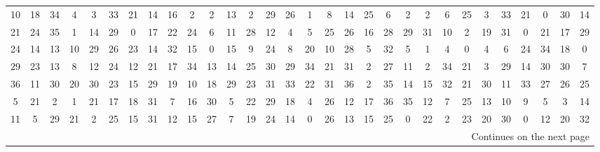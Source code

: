 \documentclass[11pt,twoside]{article}
\numberwithin{Theorem}{section}
\numberwithin{Definition}{section}
\numberwithin{Lemma}{section}
\numberwithin{Algorithm}{section}
\numberwithin{equation}{section}
\begin{document}
\begin{table}
\begin{tabular}{|*{30}{c|}}
10 &18 &34 &4 &3 &33 &21 &14 &16 &2 &2 &13 &2 &29 &26&1 &8 &14 &25 &6 &2 &2 &6 &25 &3 &33 &21 &0 &30 &14\\
21 &24 &35 &1 &14 &29 &0 &17 &22 &24 &6 &11 &28 &12 &4&5 &25 &26 &16 &28 &29 &31 &10 &2 &19 &31 &0 &21 &17 &29\\
24 &14 &13 &10 &29 &26 &23 &14 &32 &15 &0 &15 &9 &24 &8&20 &10 &28 &5 &32 &5 &1 &4 &0 &4 &6 &24 &34 &18 &0\\
29 &23 &13 &8 &12 &24 &12 &21 &17 &34 &13 &14 &25 &30 &29&34 &21 &31 &2 &27 &11 &2 &34 &21 &3 &29 &14 &30 &30 &7\\
36 &11 &30 &20 &30 &23 &15 &29 &19 &10 &18 &29 &23 &31 &33&22 &31 &36 &2 &35 &14 &15 &32 &21 &30 &11 &33 &27 &26 &25\\
5 &21 &2 &1 &21 &17 &18 &31 &7 &16 &30 &5 &22 &29 &18&4 &26 &12 &17 &36 &35 &12 &7 &25 &13 &10 &9 &5 &3 &14\\
11 &5 &29 &21 &2 &25 &15 &31 &12 &15 &27 &7 &19 &24 &14&0 &26 &13 &15 &25 &0 &22 &2 &23 &20 &30 &0 &12 &20 &32\\
  \hline
    \multicolumn{30}{r}{Continues on the next page} \\
      \end{tabular}
      \end{table}
      
\end{document}
